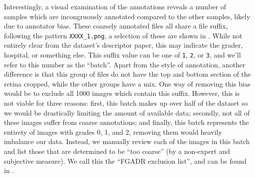 Interestingly, a visual examination of the annotations reveals a number of samples which are incongruously annotated compared to the other samples, likely due to annotator bias.
These coarsely annotated files all share a file suffix, following the pattern \lstinline{XXXX_1.png}, a selection of these are shown in .
While not entirely clear from the dataset's descriptor paper, this may indicate the grader, hospital, or something else.
This suffix value can be one of \lstinline{1}, \lstinline{2}, or \lstinline{3}, and we'll refer to this number as the ``batch''.
Apart from the style of annotation, another difference is that this group of files do not have the top and bottom section of the retina cropped, while the other groups have a mix.
One way of removing this bias would be to exclude all 1000 images which contain this suffix. 
However, this is not viable for three reasons: first, this batch makes up over half of the dataset so we would be drastically limiting the amount of available data; secondly, not all of these images suffer from coarse annotations; and finally, this batch represents the entirety of images with grades 0, 1, and 2, removing them would heavily imbalance our data.
Instead, we manually review each of the images in this batch and list those that are determined to be ``too coarse'' (by a non-expert and subjective measure).
We call this the ``FGADR exclusion list'', and can be found in .

